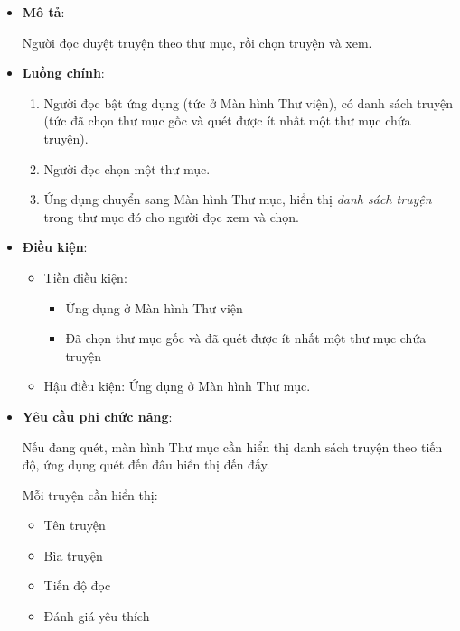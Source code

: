 \begin{itemize}
  \item
        \textbf{Mô tả}:

        Người đọc duyệt truyện theo thư mục, rồi chọn truyện và xem.
  \item
        \textbf{Luồng chính}:

        \begin{enumerate}
          \def\labelenumi{\arabic{enumi}.}
          
          \item
                Người đọc bật ứng dụng (tức ở Màn hình Thư viện), có danh sách
                truyện (tức đã chọn thư mục gốc và quét được ít nhất một thư mục
                chứa truyện).
          \item
                Người đọc chọn một thư mục.
          \item
                Ứng dụng chuyển sang Màn hình Thư mục, hiển thị \emph{danh sách
                  truyện} trong thư mục đó cho người đọc xem và chọn.
        \end{enumerate}
  \item
        \textbf{Điều kiện}:

        \begin{itemize}
          \item
                Tiền điều kiện:

                \begin{itemize}
                  
                  \item
                        Ứng dụng ở Màn hình Thư viện
                  \item
                        Đã chọn thư mục gốc và đã quét được ít nhất một thư mục chứa
                        truyện
                \end{itemize}
          \item
                Hậu điều kiện: Ứng dụng ở Màn hình Thư mục.
        \end{itemize}
  \item
        \textbf{Yêu cầu phi chức năng}:

        Nếu đang quét, màn hình Thư mục cần hiển thị danh sách truyện theo
        tiến độ, ứng dụng quét đến đâu hiển thị đến đấy.

        Mỗi truyện cần hiển thị:

        \begin{itemize}
          
          \item
                Tên truyện
          \item
                Bìa truyện
          \item
                Tiến độ đọc
          \item
                Đánh giá yêu thích
        \end{itemize}
\end{itemize}

